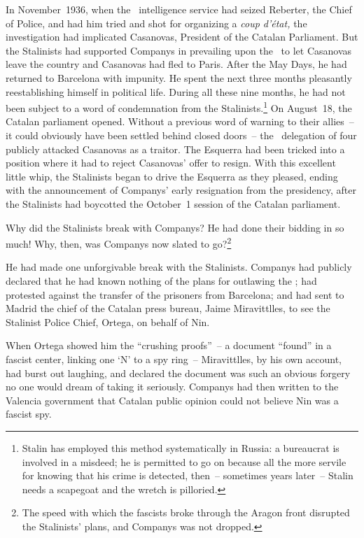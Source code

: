 In November~1936, when the \CNT\ intelligence service had seized Reberter, the Chief of Police, and had him tried and shot for organizing a \emph{coup d’\'etat,} the investigation had implicated Casanovas, President of the Catalan Parliament. But the Stalinists had supported Companys in prevailing upon the \CNT\ to let Casanovas leave the country and Casanovas had fled to Paris. After the May Days, he had returned to Barcelona with impunity. He spent the next three months pleasantly reestablishing himself in political life. During all these nine months, he had not been subject to a word of condemnation from the Stalinists.\kn\kn\footnote{Stalin has employed this method systematically in Russia: a bureaucrat is involved in a misdeed; he is permitted to go on because all the more servile for knowing that his crime is detected, then~-- sometimes years later~-- Stalin needs a scapegoat and the wretch is pilloried.} On August~18, the Catalan parliament opened. Without a previous word of warning to their allies~-- it could obviously have been settled behind closed doors~-- the \PSUC\ delegation of four publicly attacked Casanovas as a traitor. The Esquerra had been tricked into a position where it had to reject Casanovas’ offer to resign. With this excellent little whip, the Stalinists began to drive the Esquerra as they pleased, ending with the announcement of Companys’ early resignation from the presidency, after the Stalinists had boycotted the October~1 session of the Catalan parliament.

Why did the Stalinists break with Companys? He had done their bidding in so much! Why\kn, then, was Companys now slated to go?\kp\kp\footnote{The speed with which the fascists broke through the Aragon front disrupted the Stalinists’ plans, and Companys was not dropped.}

He had made one unforgivable break with the Stalinists. Companys had publicly declared that he had known nothing of the plans for outlawing the \POUM\kn; had protested against the transfer of the prisoners from Barcelona; and had sent to Madrid the chief of the Catalan press bureau, Jaime Miravittlles, to see the Stalinist Police Chief, Ortega, on behalf of Nin.

When Ortega showed him the ``crushing proofs''~-- a document ``found'' in a fascist center\kn, linking one ‘N’ to a spy ring~-- Miravittlles, by his own account, had burst out laughing, and declared the document was such an obvious forgery no one would dream of taking it seriously. Companys had then written to the Valencia government that Catalan public opinion could not believe Nin was a fascist spy.

